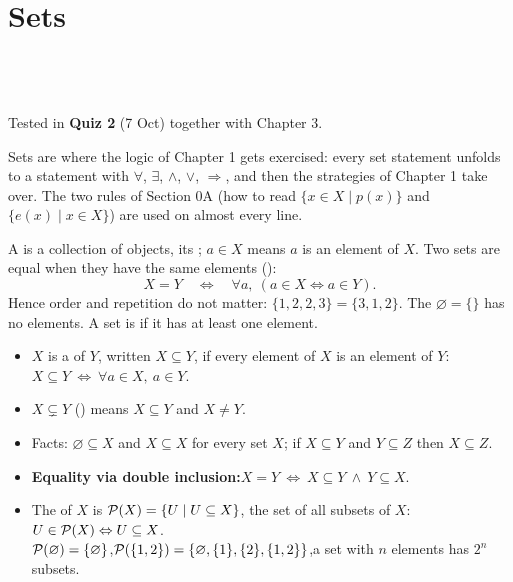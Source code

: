 \chapter{Sets}
%
{\\ \\ \\ Tested in \textbf{Quiz 2} (7 Oct) together with Chapter 3.}

Sets are where the logic of Chapter 1 gets exercised: every set statement unfolds to a statement with $\forall$, $\exists$, $\wedge$, $\vee$, $\Rightarrow$, and then the strategies of Chapter 1 take over. The two rules of Section 0A (how to read $\{x\in X\mid p(x)\}$ and $\{e(x)\mid x\in X\}$) are used on almost every line.


\begin{key}
A  is a collection of objects, its ; $a\in X$ means $a$ is an element of $X$. Two sets are equal when they have the same elements ():
\[
X=Y\quad\Leftrightarrow\quad\forall a,\ (a\in X\Leftrightarrow a\in Y).
\]
Hence order and repetition do not matter: $\{1,2,2,3\}=\{3,1,2\}$. The  $\varnothing=\{\}$ has no elements. A set is  if it has at least one element.
\end{key}

\begin{key}
\begin{itemize}
\item $X$ is a  of $Y$, written $X\subseteq Y$, if every element of $X$ is an element of $Y$:\quad $X\subseteq Y\ \Leftrightarrow\ \forall a\in X,\ a\in Y$.
\item $X\subsetneq Y$ () means $X\subseteq Y$ and $X\neq Y$.
\item Facts: $\varnothing\subseteq X$ and $X\subseteq X$ for every set $X$; if $X\subseteq Y$ and $Y\subseteq Z$ then $X\subseteq Z$.
\item \textbf{Equality via double inclusion:}\quad $X=Y\ \Leftrightarrow\ X\subseteq Y\ \wedge\ Y\subseteq X$.
\item The  of $X$ is $\mathcal{P}(X)=\{U\mid U\subseteq X\}$, the set of all subsets of $X$:\quad $U\in\mathcal{P}(X)\Leftrightarrow U\subseteq X$.\\
  $\mathcal{P}(\varnothing)=\{\varnothing\}$,\quad $\mathcal{P}(\{1,2\})=\{\varnothing,\{1\},\{2\},\{1,2\}\}$,\quad a set with $n$ elements has $2^n$ subsets.
\end{itemize}
\end{key}

